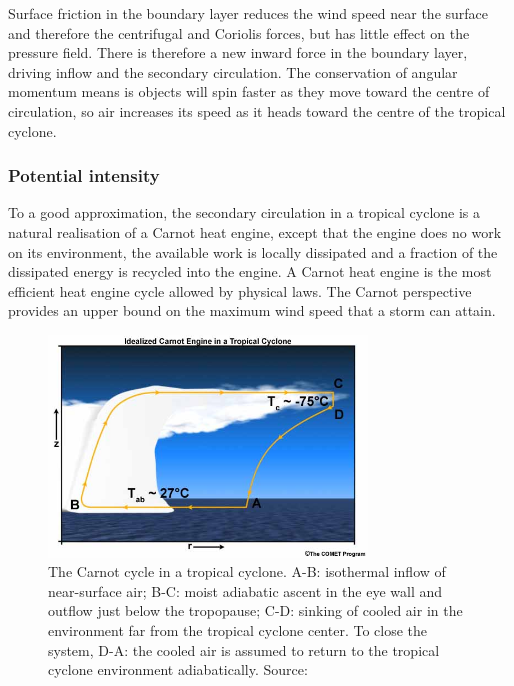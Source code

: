 Surface friction in the boundary layer reduces the wind speed near the surface and therefore the centrifugal and Coriolis forces, but has little effect on the pressure field. There is therefore a new inward force in the boundary layer, driving inflow and the secondary circulation. The conservation of angular momentum means is objects will spin faster as they move toward the centre of circulation, so air increases its speed as it heads toward the centre of the tropical cyclone.


\subsubsection{Potential intensity}

To a good approximation, the secondary circulation in a tropical cyclone is a natural realisation of a Carnot heat engine, except that the engine does no work on its environment, the available work is locally dissipated and a fraction of the dissipated energy is recycled into the engine. A Carnot heat engine is the most efficient heat engine cycle allowed by physical laws. The Carnot perspective provides an upper bound on the maximum wind speed that a storm can attain.

\begin{figure}[h]
	\centering
	\noindent\includegraphics[width=20pc,angle=0]{carnot1.jpg}
	\caption{The Carnot cycle in a tropical cyclone. A-B: isothermal inflow of near-surface air; B-C: moist adiabatic ascent in the eye wall and outflow just below the tropopause; C-D: sinking of cooled air in the environment far from the tropical cyclone center. To close the system, D-A: the cooled air is assumed to return to the tropical cyclone environment adiabatically. Source:\cite{goescarnot}}\label{fig:cyclone_carnot}
\end{figure}

